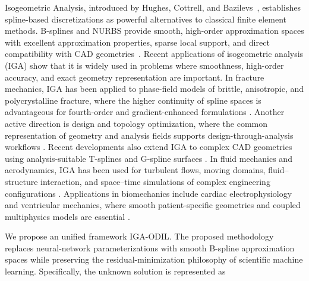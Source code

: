 \documentclass[review]{elsarticle}
\begin{document}
Isogeometric Analysis, introduced by Hughes, Cottrell, and Bazilevs~\cite{iga}, establishes spline-based discretizations as powerful alternatives to classical finite element methods. 
B-splines and NURBS provide smooth, high-order approximation spaces with excellent approximation properties, sparse local support, and direct compatibility with CAD geometries~\cite{iga,cottrell,bazilevs,sangalli2015smooth,buffa2012electromagnetics}. 
Recent applications of isogeometric analysis (IGA) show that it is widely used
in problems where smoothness, high-order accuracy, and exact geometry
representation are important. In fracture mechanics, IGA has been applied to
phase-field models of brittle, anisotropic, and polycrystalline fracture, where
the higher continuity of spline spaces is advantageous for fourth-order and
gradient-enhanced formulations \cite{Chen2020,Goswami2020,NguyenThanh2020,Greco2024}.
Another active direction is design and topology optimization, where the common
representation of geometry and analysis fields supports design-through-analysis
workflows \cite{Gao2020}. Recent developments also extend IGA to complex CAD
geometries using analysis-suitable T-splines and G-spline surfaces
\cite{Wei2022,Wen2023}. In fluid mechanics and aerodynamics, IGA has been used
for turbulent flows, moving domains, fluid--structure interaction, and
space--time simulations of complex engineering configurations
\cite{Bazilevs2023,Kuraishi2025}. Applications in biomechanics include cardiac
electrophysiology and ventricular mechanics, where smooth patient-specific
geometries and coupled multiphysics models are essential
\cite{Torre2023,Willems2024}. 

We propose an unified framework IGA-ODIL. The proposed methodology replaces neural-network parameterizations with smooth B-spline approximation spaces while preserving the residual-minimization philosophy of scientific machine learning. Specifically, the unknown solution is represented as
\end{document}
